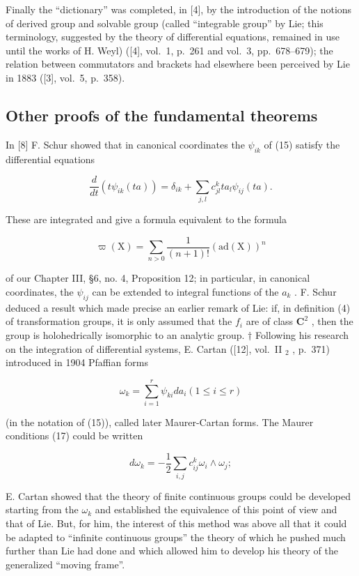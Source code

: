 Finally the ``dictionary'' was completed, in {[}4{]}, by the introduction of the notions of derived group and solvable group (called ``integrable group'' by Lie; this terminology, suggested by the theory of differential equations, remained in use until the works of H. Weyl) ({[}4{]}, vol.~1, p.~261 and vol.~3, pp.~678--679); the relation between commutators and brackets had elsewhere been perceived by Lie in 1883 ({[}3{]}, vol.~5, p.~358).

\subsection*{Other proofs of the fundamental theorems}

In {[}8{]} F. Schur showed that in canonical coordinates the \(\psi_{ik}\) of (15) satisfy the differential equations

\[
\frac {d}{d t} \left(t \psi_ {i k} (t a)\right) = \delta_ {i k} + \sum_ {j, l} c _ {j l} ^ {k} t a _ {l} \psi_ {i j} (t a).\tag{23}
\]

These are integrated and give a formula equivalent to the formula

\[
\varpi (\mathrm{X}) = \sum_ {n > 0} \frac {1}{(n + 1) !} (\mathrm{ad} (\mathrm{X})) ^ {n}\tag{24}
\]

of our Chapter III, §6, no. 4, Proposition 12; in particular, in canonical coordinates, the \(\psi_{ij}\) can be extended to integral functions of the \(a_k\) . F. Schur deduced a result which made precise an earlier remark of Lie: if, in definition (4) of transformation groups, it is only assumed that the \(f_i\) are of class \(\mathbf{C}^2\) , then the group is holohedrically isomorphic to an analytic group. \(\dagger\) Following his research on the integration of differential systems, E. Cartan ({[}12{]}, vol.~II \(_{2}\) , p.~371) introduced in 1904 Pfaffian forms

\[
\omega_ {k} = \sum_ {i = 1} ^ {r} \psi_ {k i} d a _ {i} (1 \leqslant i \leqslant r)\tag{25}
\]

(in the notation of (15)), called later Maurer-Cartan forms. The Maurer conditions (17) could be written

\[
d \omega_ {k} = - \frac {1}{2} \sum_ {i, j} c _ {i j} ^ {k} \omega_ {i} \wedge \omega_ {j};
\]

E. Cartan showed that the theory of finite continuous groups could be developed starting from the \(\omega_{k}\) and established the equivalence of this point of view and that of Lie. But, for him, the interest of this method was above all that it could be adapted to ``infinite continuous groups'' the theory of which he pushed much further than Lie had done and which allowed him to develop his theory of the generalized ``moving frame''.

